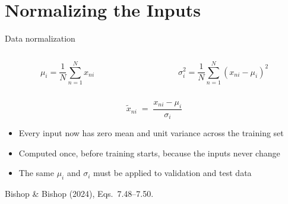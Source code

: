 \documentclass[aspectratio=169, 11pt]{beamer}
\newcommand{\srcline}[1]{%
  \par\vspace{0.25em}%
  {\scriptsize\color{mcMuted}\hfill #1\par}}
\newcommand{\src}[3]{}      %
\begin{document}
\section{Normalizing the Inputs}

\begin{frame}{Data normalization}
  \src{bishop2024}{equation}{7.48-7.50}
  \src{bishop2024}{section}{7.4.1}
  \vspace{-0.5em}
  \begin{columns}[T, onlytextwidth]
    \begin{column}{0.47\textwidth}
      \[ \mu_i = \frac{1}{N}\sum_{n=1}^{N} x_{ni} \]
    \end{column}
    \begin{column}{0.50\textwidth}
      \[ \sigma_i^2 = \frac{1}{N}\sum_{n=1}^{N}(x_{ni} - \mu_i)^2 \]
    \end{column}
  \end{columns}
  \vspace{-0.6em}
  \[
    \tilde{x}_{ni} \;=\; \frac{x_{ni} - \mu_i}{\sigma_i}
  \]
  \vspace{-0.6em}
  \begin{itemize}\itemsep0.35em
    \item Every input now has zero mean and unit variance across the
          training set
    \item Computed \alert{once}, before training starts, because the
          inputs never change
    \item The \alert{same} $\mu_i$ and $\sigma_i$ must be applied to
          validation and test data
  \end{itemize}
  \srcline{Bishop \& Bishop (2024), Eqs.~7.48--7.50.}
\end{frame}
\end{document}
